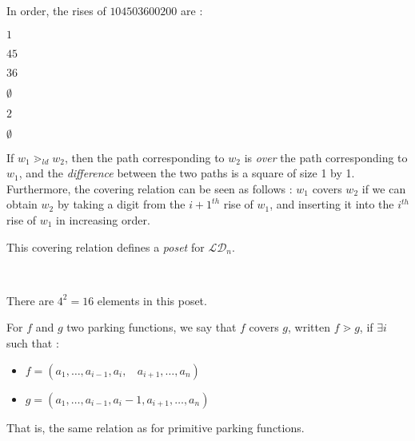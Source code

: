 \begin{example}[$n = 5$]
    In order, the rises of $104503600200$ are :\\
    \begin{itemize*}
        \item $1$
        \item $45$
        \item $36$
        \item $\emptyset$
        \item $2$
        \item $\emptyset$
    \end{itemize*}
\end{example}

\begin{rem}
    If $w_1 \gtrdot_{ld} w_2$, then the path corresponding to
    $w_2$ is \emph{over} the path corresponding to $w_1$,
    and the \emph{difference} between the two paths is a
    square of size 1 by 1.\\
    Furthermore, the covering relation can be seen as follows :
    $w_1$ covers $w_2$ if we can obtain $w_2$ by taking a
    digit from the $i + 1^{th}$ rise of $w_1$, and inserting it
    into the $i^{th}$ rise of $w_1$ in increasing order.
\end{rem}

\begin{prop}
    This covering relation defines a \emph{poset}
    for $\mathcal{LD}_n$.
\end{prop}

\begin{example}
    ~\\
    \begin{center}
        
        There are $4^2 = 16$ elements in this poset.
    \end{center}
\end{example}

\begin{definition}[$\gtrdot$]
    For $f$ and $g$ two parking functions, we say
    that $f$ covers $g$, written $f \gtrdot g$, if
    $\exists i$ such that :
    \begin{itemize}
        \item $f = (a_1, \ldots, a_{i-1}, a_i,\ \ \ \ 
            a_{i+1}, \ldots, a_n)$
        \item $g = (a_1, \ldots, a_{i-1}, a_i - 1, a_{i+1},
        \ldots, a_n)$
    \end{itemize}
    That is, the same relation as for primitive
    parking functions.
\end{definition}

